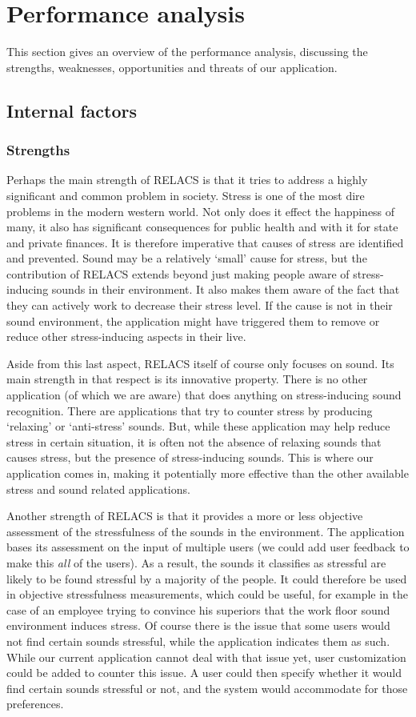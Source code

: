 \documentclass[a4paper]{article}
\begin{document}
\section{Performance analysis}
This section gives an overview of the performance analysis, discussing the strengths, weaknesses, opportunities and threats of our application.

\subsection{Internal factors}
\subsubsection{Strengths}
Perhaps the main strength of RELACS is that it tries to address a highly significant and common problem in society. Stress is one of the most dire problems in the modern western world. Not only does it effect the happiness of many, it also has significant consequences for public health and with it for state and private finances. It is therefore imperative that causes of stress are identified and prevented. Sound may be a relatively `small' cause for stress, but the contribution of RELACS extends beyond just making people aware of stress-inducing sounds in their environment. It also makes them aware of the fact that they can actively work to decrease their stress level. If the cause is not in their sound environment, the application might have triggered them to remove or reduce other stress-inducing aspects in their live.

Aside from this last aspect, RELACS itself of course only focuses on sound. Its main strength in that respect is its innovative property. There is no other application (of which we are aware) that does anything on stress-inducing sound recognition. There are applications that try to counter stress by producing `relaxing' or `anti-stress' sounds. But, while these application may help reduce stress in certain situation, it is often not the absence of relaxing sounds that causes stress, but the presence of stress-inducing sounds. This is where our application comes in, making it potentially more effective than the other available stress and sound related applications.

Another strength of RELACS is that it provides a more or less objective assessment of the stressfulness of the sounds in the environment. The application bases its assessment on the input of multiple users (we could add user feedback to make this \textit{all} of the users). As a result, the sounds it classifies as stressful are likely to be found stressful by a majority of the people. It could therefore be used in objective stressfulness measurements, which could be useful, for example in the case of an employee trying to convince his superiors that the work floor sound environment induces stress. Of course there is the issue that some users would not find certain sounds stressful, while the application indicates them as such. While our current application cannot deal with that issue yet, user customization could be added to counter this issue. A user could then specify whether it would find certain sounds stressful or not, and the system would accommodate for those preferences.
\end{document}
